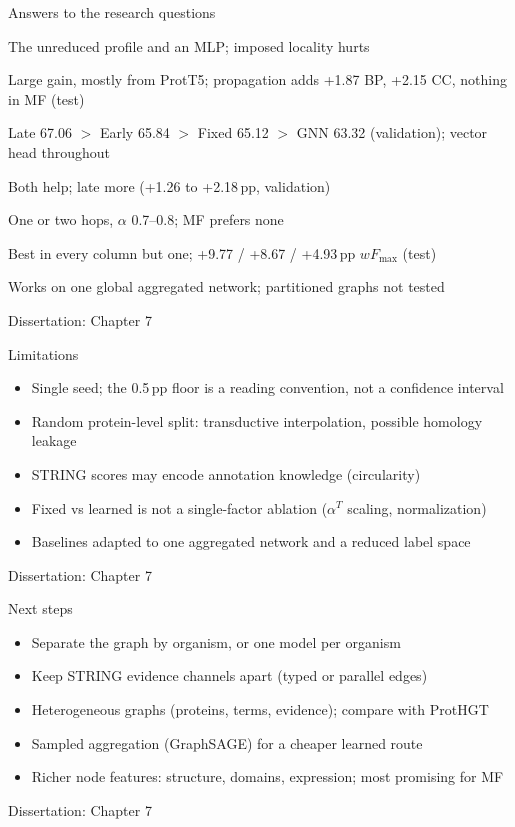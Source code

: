 \documentclass[aspectratio=169,10pt]{beamer}
\newcommand{\src}[1]{\par\vfill\hfill{\scriptsize\color{gray}Dissertation: #1}}
\newcommand{\wF}{wF_{\max}}
\begin{document}
\begin{frame}{Answers to the research questions}
  \small
  \begin{description}[RQ7]
    \item[RQ1] The unreduced profile and an MLP; imposed locality hurts
    \item[RQ2] Large gain, mostly from ProtT5; propagation adds +1.87 BP, +2.15 CC, nothing in MF (test)
    \item[RQ3] Late 67.06 $>$ Early 65.84 $>$ Fixed 65.12 $>$ GNN 63.32 (validation); vector head throughout
    \item[RQ4] Both help; late more (+1.26 to +2.18\,pp, validation)
    \item[RQ5] One or two hops, $\alpha$ 0.7--0.8; MF prefers none
    \item[RQ6] Best in every column but one; +9.77 / +8.67 / +4.93\,pp $\wF$ (test)
    \item[RQ7] Works on one global aggregated network; partitioned graphs not tested
  \end{description}
  \src{Chapter 7}
\end{frame}

\begin{frame}{Limitations}
  \begin{itemize}
    \item Single seed; the 0.5\,pp floor is a reading convention, not a confidence interval
    \item Random protein-level split: transductive interpolation, possible homology leakage
    \item STRING scores may encode annotation knowledge (circularity)
    \item Fixed vs learned is not a single-factor ablation ($\alpha^{T}$ scaling, normalization)
    \item Baselines adapted to one aggregated network and a reduced label space
  \end{itemize}
  \src{Chapter 7}
\end{frame}

\begin{frame}{Next steps}
  \begin{itemize}
    \item Separate the graph by organism, or one model per organism
    \item Keep STRING evidence channels apart (typed or parallel edges)
    \item Heterogeneous graphs (proteins, terms, evidence); compare with ProtHGT
    \item Sampled aggregation (GraphSAGE) for a cheaper learned route
    \item Richer node features: structure, domains, expression; most promising for MF
  \end{itemize}
  \src{Chapter 7}
\end{frame}
\end{document}
